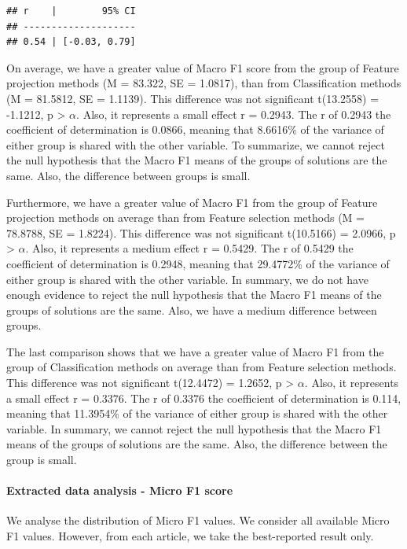 \documentclass[
]{article}
\begin{document}
\begin{verbatim}
## r    |        95% CI
## --------------------
## 0.54 | [-0.03, 0.79]
\end{verbatim}

On average, we have a greater value of Macro F1 score from the group of Feature projection methods (M = 83.322, SE = 1.0817), than from Classification methods (M = 81.5812, SE = 1.1139). This difference was not significant t(13.2558) = -1.1212, p \textgreater{} \(\alpha\). Also, it represents a small effect r = 0.2943. The r of 0.2943 the coefficient of determination is 0.0866, meaning that 8.6616\% of the variance of either group is shared with the other variable. To summarize, we cannot reject the null hypothesis that the Macro F1 means of the groups of solutions are the same. Also, the difference between groups is small.

Furthermore, we have a greater value of Macro F1 from the group of Feature projection methods on average than from Feature selection methods (M = 78.8788, SE = 1.8224). This difference was not significant t(10.5166) = 2.0966, p \textgreater{} \(\alpha\). Also, it represents a medium effect r = 0.5429. The r of 0.5429 the coefficient of determination is 0.2948, meaning that 29.4772\% of the variance of either group is shared with the other variable. In summary, we do not have enough evidence to reject the null hypothesis that the Macro F1 means of the groups of solutions are the same. Also, we have a medium difference between groups.

The last comparison shows that we have a greater value of Macro F1 from the group of Classification methods on average than from Feature selection methods. This difference was not significant t(12.4472) = 1.2652, p \textgreater{} \(\alpha\). Also, it represents a small effect r = 0.3376. The r of 0.3376 the coefficient of determination is 0.114, meaning that 11.3954\% of the variance of either group is shared with the other variable. In summary, we cannot reject the null hypothesis that the Macro F1 means of the groups of solutions are the same. Also, the difference between the group is small.

\hypertarget{extracted-data-analysis---micro-f1-score}{%
\paragraph{Extracted data analysis - Micro F1 score}\label{extracted-data-analysis---micro-f1-score}}

We analyse the distribution of Micro F1 values. We consider all available Micro F1 values. However, from each article, we take the best-reported result only.
\end{document}
